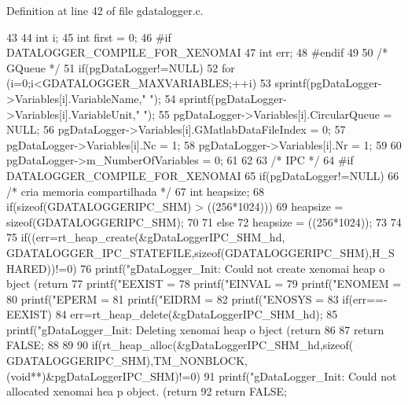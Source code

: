 Definition at line 42 of file gdatalogger.c.


\begin{DoxyCode}
43 {
44         int i;
45         int first = 0;
46 #if DATALOGGER_COMPILE_FOR_XENOMAI
47         int err;
48 #endif
49 
50         /* GQueue */
51         if(pgDataLogger!=NULL){
52                 for (i=0;i<GDATALOGGER_MAXVARIABLES;++i){
53                         sprintf(pgDataLogger->Variables[i].VariableName," ");
54                         sprintf(pgDataLogger->Variables[i].VariableUnit," ");
55                         pgDataLogger->Variables[i].CircularQueue = NULL;
56                         pgDataLogger->Variables[i].GMatlabDataFileIndex = 0;
57                         pgDataLogger->Variables[i].Nc = 1;
58                         pgDataLogger->Variables[i].Nr = 1;
59                 }
60                 pgDataLogger->m_NumberOfVariables = 0;
61         }
62 
63         /* IPC */
64 #if DATALOGGER_COMPILE_FOR_XENOMAI
65         if(pgDataLogger!=NULL){
66                 /* cria memoria compartilhada */
67                 int heapsize;
68                 if(sizeof(GDATALOGGERIPC_SHM) > ((256*1024))){
69                         heapsize = sizeof(GDATALOGGERIPC_SHM);
70                 }
71                 else{
72                         heapsize = ((256*1024));
73                 }
74                 
75                 if((err=rt_heap_create(&gDataLoggerIPC_SHM_hd,
      GDATALOGGER_IPC_STATEFILE,sizeof(GDATALOGGERIPC_SHM),H_SHARED))!=0){
76                         printf("gDataLogger_Init: Could not create xenomai heap o
      bject (return %
77                         printf("\n EEXIST = %
78                         printf("\n EINVAL = %
79                         printf("\n ENOMEM = %
80                         printf("\n EPERM = %
81                         printf("\n EIDRM = %
82                         printf("\n ENOSYS = %
83                         if(err==-EEXIST){
84                                 err=rt_heap_delete(&gDataLoggerIPC_SHM_hd);
85                                 printf("gDataLogger_Init: Deleting xenomai heap o
      bject (return %
86                         }
87                         return FALSE;
88                 }
89 
90                 if(rt_heap_alloc(&gDataLoggerIPC_SHM_hd,sizeof(
      GDATALOGGERIPC_SHM),TM_NONBLOCK,(void**)&pgDataLoggerIPC_SHM)!=0){
91                         printf("gDataLogger_Init: Could not allocated xenomai hea
      p object. (return %
92                         return FALSE;
}}}
\end{DoxyCode}
